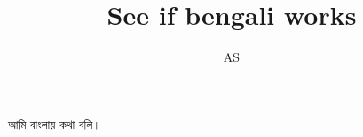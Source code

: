 \documentclass[11pt,a4paper]{article}
\author{AS}
\title{See if bengali works}
\begin{document}
আমি বাংলায় কথা বলি। 
\end{document}
